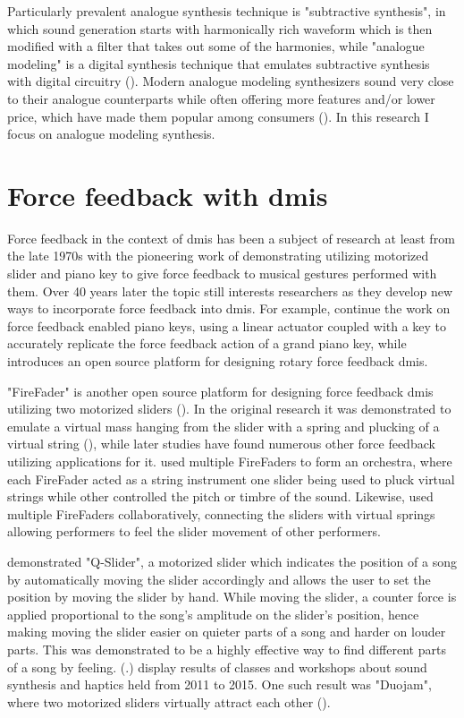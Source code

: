 Particularly prevalent analogue synthesis technique is "subtractive synthesis", in which sound generation starts with harmonically rich waveform which is then modified with a filter that takes out some of the harmonies, while "analogue modeling" is a digital synthesis technique that emulates subtractive synthesis with digital circuitry (\cite{russ2009}). Modern analogue modeling synthesizers sound very close to their analogue counterparts while often offering more features and/or lower price, which have made them popular among consumers (\cite{russ2009}). In this research I focus on analogue modeling synthesis.

\section{Force feedback with \glspl{dmi}}

Force feedback in the context of \glspl{dmi} has been a subject of research at least from the late 1970s with the pioneering work of \textcite{cadoz1984} demonstrating utilizing motorized slider and piano key to give force feedback to musical gestures performed with them. Over 40 years later the topic still interests researchers as they develop new ways to incorporate force feedback into \glspl{dmi}. For example, \textcite{timmermans2020} continue the work on force feedback enabled piano keys, using a linear actuator coupled with a key to accurately replicate the force feedback action of a grand piano key, while \textcite{kirkegaard2020} introduces an open source platform for designing rotary force feedback \glspl{dmi}.

"FireFader" is another open source platform for designing force feedback \glspl{dmi} utilizing two motorized sliders (\cite{berdahl-kontogeorgakopoulos2013}). In the original research it was demonstrated to emulate a virtual mass hanging from the slider with a spring and plucking of a virtual string (\cite{berdahl-kontogeorgakopoulos2013}), while later studies have found numerous other force feedback utilizing applications for it. \textcite{papetti2018} used multiple FireFaders to form an orchestra, where each FireFader acted as a string instrument one slider being used to pluck virtual strings while other controlled the pitch or timbre of the sound. Likewise, \textcite{kontogeorgakopoulos2019} used multiple FireFaders collaboratively, connecting the sliders with virtual springs allowing performers to feel the slider movement of other performers.

\textcite{beamish2004} demonstrated "Q-Slider", a motorized slider which indicates the position of a song by automatically moving the slider accordingly and allows the user to set the position by moving the slider by hand. While moving the slider, a counter force is applied proportional to the song's amplitude on the slider's position, hence making moving the slider easier on quieter parts of a song and harder on louder parts. This was demonstrated to be a highly effective way to find different parts of a song by feeling. (\cite{beamish2004}.) \textcite{bak2015} display results of classes and workshops about sound synthesis and haptics held from 2011 to 2015. One such result was "Duojam", where two motorized sliders virtually attract each other (\cite{bak2015}).